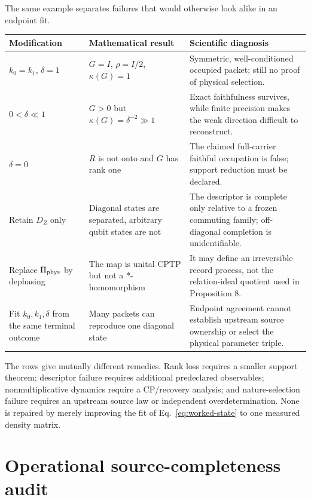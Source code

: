 \documentclass[11pt]{article}
\begin{document}
The same example separates failures that would otherwise look alike in an
endpoint fit.
\begin{longtable}{p{.22\linewidth}p{.28\linewidth}p{.38\linewidth}}
\toprule
Modification & Mathematical result & Scientific diagnosis\\
\midrule
\endhead
\(k_0=k_1\), \(\delta=1\) & \(G=I\),
\(\rho=I/2\), \(\kappa(G)=1\) & Symmetric, well-conditioned occupied packet;
still no proof of physical selection.\\
\(0<\delta\ll1\) & \(G>0\) but
\(\kappa(G)=\delta^{-2}\gg1\) & Exact faithfulness survives, while finite
precision makes the weak direction difficult to reconstruct.\\
\(\delta=0\) & \(R\) is not onto and \(G\) has rank one & The claimed
full-carrier faithful occupation is false; support reduction must be declared.\\
Retain \(D_Z\) only & Diagonal states are separated, arbitrary qubit states
are not & The descriptor is complete only relative to a frozen commuting
family; off-diagonal completion is unidentifiable.\\
Replace \(\Pi_{\rm phys}\) by dephasing & The map is unital CPTP but not a
\(*\)-homomorphism & It may define an irreversible record process, not the
relation-ideal quotient used in Proposition 8.\\
Fit \(k_0,k_1,\delta\) from the same terminal outcome & Many packets can
reproduce one diagonal state & Endpoint agreement cannot establish upstream
source ownership or select the physical parameter triple.\\
\bottomrule
\end{longtable}

The rows give mutually different remedies.  Rank loss requires a smaller
support theorem; descriptor failure requires additional predeclared
observables; nonmultiplicative dynamics require a CP/recovery analysis; and
nature-selection failure requires an upstream source law or independent
overdetermination.  None is repaired by merely improving the fit of
Eq.~\eqref{eq:worked-state} to one measured density matrix.

\section{Operational source-completeness audit}
\end{document}
